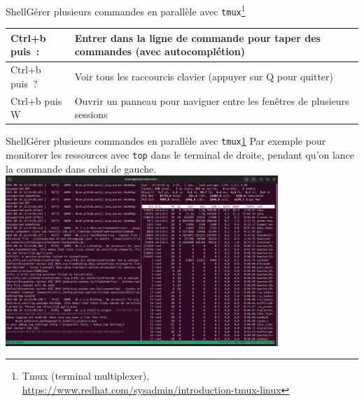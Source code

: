 \documentclass{beamer}
\begin{document}
\begin{frame}{Shell}{Gérer plusieurs commandes en parallèle avec \lstinline{tmux}\footnote{\label{itm:tmux}Tmux (terminal multiplexer), \url{https://www.redhat.com/sysadmin/introduction-tmux-linux}}}
\begin{footnotesize}
\begin{table}[ht]
\begin{tabular}{|p{3.5cm}|p{8cm}|}
                    \hline
                    Ctrl+b puis~:                                         & Entrer dans la ligne de commande pour taper des commandes (avec autocomplétion) \\
                    \hline
                    Ctrl+b puis~?                                         & Voir tous les raccourcis clavier (appuyer sur Q pour quitter)                   \\
                    \hline
                    Ctrl+b puis W                                         & Ouvrir un panneau pour naviguer entre les fenêtres de plusieurs sessions        \\
                    \hline
                \end{tabular}
            \end{table}
        \end{footnotesize}
    \end{frame}

    \begin{frame}{Shell}{Gérer plusieurs commandes en parallèle avec \lstinline{tmux}\cref{itm:tmux}}
        Par exemple pour monitorer les ressources avec \lstinline{top} dans le terminal de droite, pendant qu'on lance la commande dans celui de gauche.
        \bigbreak
        \centering
        \includegraphics[width=10.3cm]{image/tmux-illustration}
    \end{frame}
\end{document}
